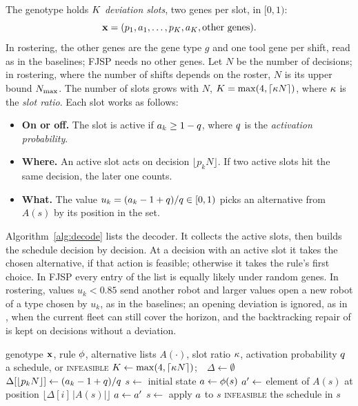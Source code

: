 The genotype holds $K$ \emph{deviation slots}, two genes per slot, in $[0,1)$:
\begin{equation}
  \mathbf{x} = (p_1, a_1, \dots, p_K, a_K, \text{other genes}).
\end{equation}
In rostering, the other genes are the gene type $g$ and one tool gene per shift, read as in the baselines; FJSP needs no other genes.
Let $N$ be the number of decisions; in rostering, where the number of shifts depends on the roster, $N$ is its upper bound $N_{\max}$.
The number of slots grows with $N$, $K = \max(4, \lceil \kappa N \rceil)$, where $\kappa$ is the \emph{slot ratio}.
Each slot works as follows:
\begin{itemize}
  \item \textbf{On or off.} The slot is active if $a_k \ge 1 - q$, where $q$ is the \emph{activation probability}.
  \item \textbf{Where.} An active slot acts on decision $\lfloor p_k N \rfloor$. If two active slots hit the same decision, the later one counts.
  \item \textbf{What.} The value $u_k = (a_k - 1 + q)/q \in [0,1)$ picks an alternative from $A(s)$ by its position in the set.
\end{itemize}
Algorithm~\ref{alg:decode} lists the decoder.
It collects the active slots, then builds the schedule decision by decision.
At a decision with an active slot it takes the chosen alternative, if that action is feasible; otherwise it takes the rule's first choice.
In FJSP every entry of the list is equally likely under random genes.
In rostering, values $u_k < 0.85$ send another robot and larger values open a new robot of a type chosen by $u_k$, as in the baselines;
an opening deviation is ignored, as in , when the current fleet can still cover the horizon, and the backtracking repair of  is kept on decisions without a deviation.

\begin{algorithm}[t]
  \caption{Rule-deviation decoding}
  \label{alg:decode}
  \begin{algorithmic}[1]
    \Require genotype $\mathbf{x}$, rule $\phi$, alternative lists $A(\cdot)$, slot ratio $\kappa$, activation probability $q$
    \Ensure a schedule, or \textsc{infeasible}
    \State $K \gets \max(4, \lceil \kappa N \rceil)$;\ \ $\Delta \gets \emptyset$
       \State $\Delta[\lfloor p_k N \rfloor] \gets (a_k - 1 + q)/q$ \EndIf
    \EndFor
    \State $s \gets$ initial state
      \State $a \gets \phi(s)$
        \State $a' \gets$ element of $A(s)$ at position $\lfloor \Delta[i]\, |A(s)| \rfloor$
         $a \gets a'$ \EndIf
      \EndIf
      \State $s \gets$ apply $a$ to $s$
       \Return \textsc{infeasible} \EndIf
    \EndFor
    \State \Return the schedule in $s$
  \end{algorithmic}
\end{algorithm}

